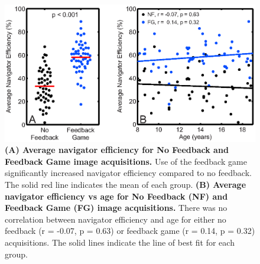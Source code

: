 	\begin{figure}
		\centering %
		\includegraphics{figures/gamepaper/03-navEffAve_NFvsFG_AND_vsAge}
		\caption[Navigator Efficiency for Feedback Game vs No Feedback]{\textbf{(A) Average navigator efficiency for No Feedback and Feedback Game image acquisitions.} Use of the feedback game significantly increased navigator efficiency compared to no feedback. The solid red line indicates the mean of each group. \textbf{(B) Average navigator efficiency vs age for No Feedback (NF) and Feedback Game (FG) image acquisitions.} There was no correlation between navigator efficiency and age for either no feedback (r = -0.07, p = 0.63) or feedback game (r = 0.14, p = 0.32) acquisitions. The solid lines indicate the line of best fit for each group.}
		\label{fig:navEff_FGvsNF}
	\end{figure}

